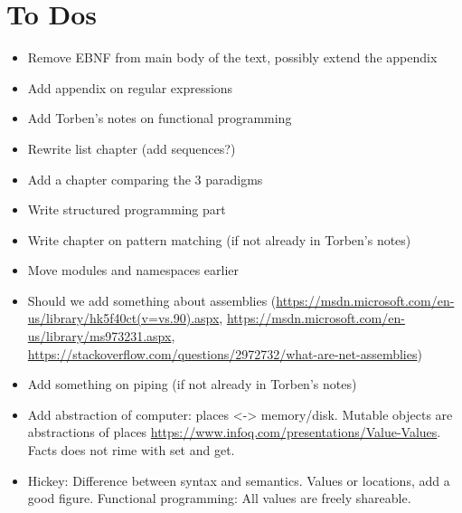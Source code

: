 \chapter{To Dos}
\begin{itemize}
\item Remove EBNF from main body of the text, possibly extend the
  appendix
\item Add appendix on regular expressions
\item Add Torben's notes on functional programming
\item Rewrite list chapter (add sequences?)
\item Add a chapter comparing the 3 paradigms
\item Write structured programming part
\item Write chapter on pattern matching (if not already in Torben's
  notes)
\item Move modules and namespaces earlier
\item Should we add something about assemblies
  (\url{https://msdn.microsoft.com/en-us/library/hk5f40ct(v=vs.90).aspx},
  \url{https://msdn.microsoft.com/en-us/library/ms973231.aspx}, \url{https://stackoverflow.com/questions/2972732/what-are-net-assemblies})
\item Add something on piping (if not already in Torben's notes)
\item Add abstraction of computer: places <-> memory/disk. Mutable
  objects are abstractions of places
  \url{https://www.infoq.com/presentations/Value-Values}. Facts does
  not rime with set and get. 
\item Hickey: Difference between syntax and semantics. Values or
  locations, add a good figure. Functional programming: All values are
  freely shareable.
\end{itemize}
